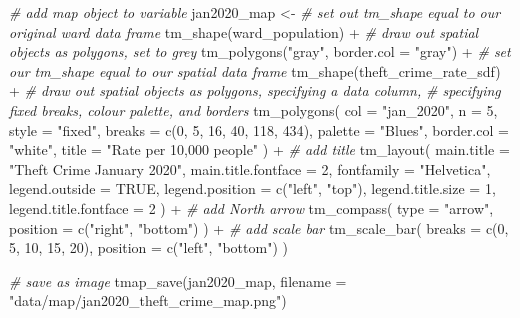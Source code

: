 \documentclass[
]{book}
\newenvironment{Shaded}{\begin{snugshade}}{\end{snugshade}}
\newcommand{\AttributeTok}[1]{\textcolor[rgb]{0.77,0.63,0.00}{#1}}
\newcommand{\CommentTok}[1]{\textcolor[rgb]{0.56,0.35,0.01}{\textit{#1}}}
\newcommand{\ConstantTok}[1]{\textcolor[rgb]{0.00,0.00,0.00}{#1}}
\newcommand{\DecValTok}[1]{\textcolor[rgb]{0.00,0.00,0.81}{#1}}
\newcommand{\FunctionTok}[1]{\textcolor[rgb]{0.00,0.00,0.00}{#1}}
\newcommand{\NormalTok}[1]{#1}
\newcommand{\OtherTok}[1]{\textcolor[rgb]{0.56,0.35,0.01}{#1}}
\newcommand{\SpecialCharTok}[1]{\textcolor[rgb]{0.00,0.00,0.00}{#1}}
\newcommand{\StringTok}[1]{\textcolor[rgb]{0.31,0.60,0.02}{#1}}
\begin{document}
\begin{Shaded}
\begin{Highlighting}[]
\CommentTok{\# add map object to variable}
\NormalTok{jan2020\_map }\OtherTok{\textless{}{-}}
  \CommentTok{\# set out tm\_shape equal to our original ward data frame}
  \FunctionTok{tm\_shape}\NormalTok{(ward\_population) }\SpecialCharTok{+}
  \CommentTok{\# draw out spatial objects as polygons, set to grey}
  \FunctionTok{tm\_polygons}\NormalTok{(}\StringTok{"gray"}\NormalTok{, }\AttributeTok{border.col =} \StringTok{"gray"}\NormalTok{) }\SpecialCharTok{+}
  \CommentTok{\# set our tm\_shape equal to our spatial data frame}
  \FunctionTok{tm\_shape}\NormalTok{(theft\_crime\_rate\_sdf) }\SpecialCharTok{+}
  \CommentTok{\# draw out spatial objects as polygons, specifying a data column,}
  \CommentTok{\# specifying fixed breaks, colour palette, and borders}
  \FunctionTok{tm\_polygons}\NormalTok{(}
    \AttributeTok{col =} \StringTok{"jan\_2020"}\NormalTok{, }\AttributeTok{n =} \DecValTok{5}\NormalTok{, }\AttributeTok{style =} \StringTok{"fixed"}\NormalTok{,}
    \AttributeTok{breaks =} \FunctionTok{c}\NormalTok{(}\DecValTok{0}\NormalTok{, }\DecValTok{5}\NormalTok{, }\DecValTok{16}\NormalTok{, }\DecValTok{40}\NormalTok{, }\DecValTok{118}\NormalTok{, }\DecValTok{434}\NormalTok{),}
    \AttributeTok{palette =} \StringTok{"Blues"}\NormalTok{, }\AttributeTok{border.col =} \StringTok{"white"}\NormalTok{,}
    \AttributeTok{title =} \StringTok{"Rate per 10,000 people"}
\NormalTok{  ) }\SpecialCharTok{+}
  \CommentTok{\# add title}
  \FunctionTok{tm\_layout}\NormalTok{(}
    \AttributeTok{main.title =} \StringTok{"Theft Crime January 2020"}\NormalTok{,}
    \AttributeTok{main.title.fontface =} \DecValTok{2}\NormalTok{,}
    \AttributeTok{fontfamily =} \StringTok{"Helvetica"}\NormalTok{,}
    \AttributeTok{legend.outside =} \ConstantTok{TRUE}\NormalTok{,}
    \AttributeTok{legend.position =} \FunctionTok{c}\NormalTok{(}\StringTok{"left"}\NormalTok{, }\StringTok{"top"}\NormalTok{),}
    \AttributeTok{legend.title.size =} \DecValTok{1}\NormalTok{,}
    \AttributeTok{legend.title.fontface =} \DecValTok{2}
\NormalTok{  ) }\SpecialCharTok{+}
  \CommentTok{\# add North arrow}
  \FunctionTok{tm\_compass}\NormalTok{(}
    \AttributeTok{type =} \StringTok{"arrow"}\NormalTok{,}
    \AttributeTok{position =} \FunctionTok{c}\NormalTok{(}\StringTok{"right"}\NormalTok{, }\StringTok{"bottom"}\NormalTok{)}
\NormalTok{  ) }\SpecialCharTok{+}
  \CommentTok{\# add scale bar}
  \FunctionTok{tm\_scale\_bar}\NormalTok{(}
    \AttributeTok{breaks =} \FunctionTok{c}\NormalTok{(}\DecValTok{0}\NormalTok{, }\DecValTok{5}\NormalTok{, }\DecValTok{10}\NormalTok{, }\DecValTok{15}\NormalTok{, }\DecValTok{20}\NormalTok{),}
    \AttributeTok{position =} \FunctionTok{c}\NormalTok{(}\StringTok{"left"}\NormalTok{, }\StringTok{"bottom"}\NormalTok{)}
\NormalTok{  )}

\CommentTok{\# save as image}
\FunctionTok{tmap\_save}\NormalTok{(jan2020\_map, }\AttributeTok{filename =} \StringTok{"data/map/jan2020\_theft\_crime\_map.png"}\NormalTok{)}
\end{Highlighting}
\end{Shaded}
\end{document}
